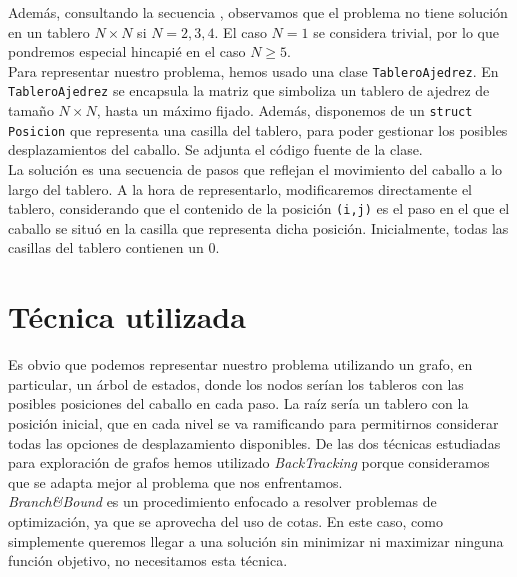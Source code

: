 \documentclass[11pt]{article}
\begin{document}
Además, consultando la secuencia \cite{sequence}, observamos que el problema no tiene solución en un tablero $N\times N$ si $N=2,3,4$. El caso $N=1$ se considera trivial, por lo que pondremos especial hincapié en el caso $N\ge5$.\\

Para representar nuestro problema, hemos usado una clase \verb|TableroAjedrez|. En \verb|TableroAjedrez| se encapsula la matriz que simboliza un tablero de ajedrez de tamaño $N\times N$, hasta un máximo fijado. Además, disponemos de un \verb|struct Posicion| que representa una casilla del tablero, para poder gestionar los posibles desplazamientos del caballo. Se adjunta el código fuente de la clase.\\

La solución es una secuencia de pasos que reflejan el movimiento del caballo a lo largo del tablero. A la hora de representarlo, modificaremos directamente el tablero, considerando que el contenido de la posición \verb|(i,j)| es el paso en el que el caballo se situó en la casilla que representa dicha posición. Inicialmente, todas las casillas del tablero contienen un $0$.

\section*{Técnica utilizada}

Es obvio que podemos representar nuestro problema utilizando un grafo, en particular, un árbol de estados, donde los nodos serían los tableros con las posibles posiciones del caballo en cada paso. La raíz sería un tablero con la posición inicial, que en cada nivel se va ramificando para permitirnos considerar todas las opciones de desplazamiento disponibles. De las dos técnicas estudiadas para exploración de grafos hemos utilizado \textit{BackTracking} porque consideramos que se adapta mejor al problema que nos enfrentamos.\\

\textit{Branch\&Bound} es un procedimiento enfocado a resolver problemas de optimización, ya que se aprovecha del uso de cotas. En este caso, como simplemente queremos llegar a una solución sin minimizar ni maximizar ninguna función objetivo, no necesitamos esta técnica.
\end{document}
